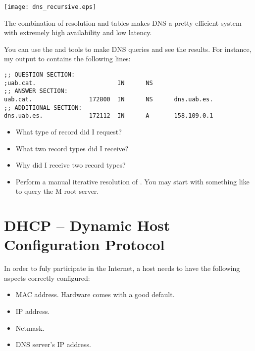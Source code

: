 \begin{center}
\texttt{[image: dns\_recursive.eps]}
\end{center}

The combination of  resolution and  tables makes
DNS a pretty efficient system with extremely high availability and low latency.

\begin{exercise}
You can use the  and  tools to make DNS queries
and see the results. For instance, my output to 
contains the following lines:

\vspace{0.25cm}
\begin{verbatim}
;; QUESTION SECTION:
;uab.cat.                       IN      NS
;; ANSWER SECTION:
uab.cat.                172800  IN      NS      dns.uab.es.
;; ADDITIONAL SECTION:
dns.uab.es.             172112  IN      A       158.109.0.1
\end{verbatim}
\vspace{0.25cm}

\begin{itemize}
\item What type of record did I request?
\item What two record types did I receive?
\item Why did I receive two record types?
\item Perform a manual iterative resolution of .
  You may start with something like 
  to query the M root server.
\end{itemize}
\end{exercise}


\section{DHCP -- Dynamic Host Configuration Protocol}

In order to fuly participate in the Internet, a host needs to have 
the following aspects correctly configured:
\begin{itemize}
\item MAC address. Hardware comes with a good default.
\item IP address.
\item Netmask.
\item DNS server's IP address.
\end{itemize}

